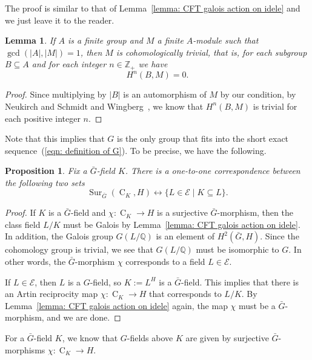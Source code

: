 \documentclass{amsart}
\numberwithin{equation}{section}
\theoremstyle{plain}
\newtheorem{proposition}[theorem]{Proposition}
\newtheorem{lemma}[theorem]{Lemma}
\theoremstyle{definition}
\theoremstyle{remark}
\begin{document}
The proof is similar to that of Lemma~\ref{lemma: CFT galois action on idele} and we just leave it to the reader.
\begin{lemma}\label{lemma: H^2(C3,C2^2)}
	If $A$ is a finite group and $M$ a finite $A$-module such that $\gcd(\lvert A\rvert,\lvert M\rvert)=1$, then $M$ is cohomologically trivial, that is, for each subgroup $B\subseteq A$ and for each integer $n\in\mathbb{Z}_+$ we have 
	\begin{equation*}
		H^n(B,M)=0.
	\end{equation*}
\end{lemma}
\begin{proof}
	Since multiplying by $\lvert B\rvert$ is an automorphism of $M$ by our condition, by Neukirch and Schmidt and Wingberg~\cite[I.1.6.2]{neukirch2013cohomology}, we know that $H^n(B,M)$ is trivial for each positive integer $n$.
\end{proof}
Note that this implies that $G$ is the only group that fits into the short exact sequence~(\ref{eqn: definition of G}).
To be precise, we have the following.
\begin{proposition}\label{prop: C3-morphism}
	Fix a $\bar{G}$-field $K$.
	There is a one-to-one correspondence between the following two sets
	\begin{equation*}
		\operatorname{Sur}_{\bar{G}}(\operatorname{C}_K,H)\leftrightarrow\{L\in\mathcal{E}\mid K\subseteq L\}.
	\end{equation*}
\end{proposition}
\begin{proof}
	If $K$ is a $\bar{G}$-field and $\chi:\operatorname{C}_K\to H$ is a surjective $\bar{G}$-morphism, then the class field $L/K$ must be Galois by Lemma~\ref{lemma: CFT galois action on idele}.
	In addition, the Galois group $G(L/\mathbb{Q})$ is an element of $H^2(\bar{G},H)$.
	Since the cohomology group is trivial, we see that $G(L/\mathbb{Q})$ must be isomorphic to $G$.
	In other words, the $\bar{G}$-morphism $\chi$ corresponds to a field $L\in\mathcal{E}$.
	
	If $L\in\mathcal{E}$, then $L$ is a $G$-field, so $K:=L^{H}$ is a $\bar{G}$-field.
	This implies that there is an Artin reciprocity map $\chi:\operatorname{C}_K\to H$ that corresponds to $L/K$.
	By Lemma~\ref{lemma: CFT galois action on idele} again, the map $\chi$ must be a $\bar{G}$-morphism, and we are done.
\end{proof}
For a $\bar{G}$-field $K$, we know that $G$-fields above $K$ are given by surjective $\bar{G}$-morphisms $\chi:\operatorname{C}_K\to H$.
\end{document}

